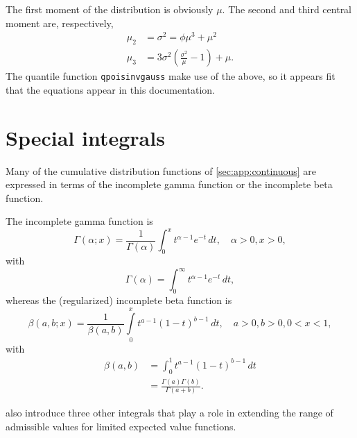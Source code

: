 \documentclass[x11names]{article}
\newcommand{\code}[1]{\texttt{#1}}
\begin{document}
The first moment of the distribution is obviously $\mu$. The second
and third central moment are, respectively,
\begin{align*}
  \mu_2 &= \sigma^2 = \phi\mu^3 + \mu^2 \\
  \mu_3 &= 3 \sigma^2 \left( \frac{\sigma^2}{\mu} - 1 \right) + \mu.
\end{align*}
The quantile function \code{qpoisinvgauss} make use of the above, so
it appears fit that the equations appear in this documentation.



\section{Special integrals}
\label{sec:special-integrals}

Many of the cumulative distribution functions of
\autoref{sec:app:continuous} are expressed in terms of the incomplete
gamma function or the incomplete beta function.

The incomplete gamma function is
\begin{equation}
  \label{eq:pgamma}
  \Gamma(\alpha; x) = \frac{1}{\Gamma(\alpha)}
  \int_0^x t^{\alpha - 1} e^{-t}\, dt, \quad \alpha > 0, x > 0,
\end{equation}
with
\begin{equation*}
  \Gamma(\alpha) = \int_0^\infty t^{\alpha - 1} e^{-t}\, dt,
\end{equation*}
whereas the (regularized) incomplete beta function is
\begin{equation}
  \label{eq:pbeta}
  \beta(a, b; x) = \frac{1}{\beta(a, b)}
  \int\limits_0^x t^{a - 1} (1 - t)^{b - 1}\, dt, \quad a > 0, b > 0, 0 < x < 1,
\end{equation}
with
\begin{align*}
  \beta(a, b)
  &= \int_0^1 t^{a - 1} (1 - t)^{b - 1}\, dt \\
  &= \frac{\Gamma(a) \Gamma(b)}{\Gamma(a + b)}.
\end{align*}

\citet{LossModels4e} also introduce three other integrals that play a
role in extending the range of admissible values for limited expected
value functions.
\end{document}
